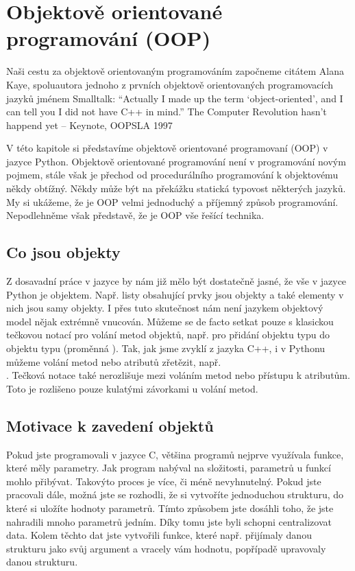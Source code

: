 \chapter{Objektově orientované programování (OOP)}

Naši cestu za objektově orientovaným programováním započneme citátem Alana Kaye, spoluautora jednoho
z prvních objektově orientovaných programovacích jazyků jménem Smalltalk:
\vskip0.5cm
\noindent
``Actually I made up the term `object-oriented', and I can tell
you I did not have C++ in mind.''
\vskip0.3cm
\noindent
The Computer Revolution hasn’t happend yet -- Keynote, OOPSLA 1997

\vskip0.5cm

V této kapitole si představíme objektově orientované programovaní (OOP) v jazyce Python.
Objektově orientované programování není v programování novým pojmem, stále však je přechod
od procedurálního programování k objektovému někdy obtížný. Někdy může být na překážku statická typovost
některých jazyků. My si ukážeme, že je OOP velmi jednoduchý a příjemný způsob programování. Nepodlehněme
však představě, že je OOP vše řešící technika.


\section{Co jsou objekty}

Z dosavadní práce v jazyce by nám již mělo být dostatečně jasné, že vše v jazyce Python je objektem.
Např. listy obsahující prvky jsou objekty a také elementy v nich jsou samy objekty. I přes tuto skutečnost
nám není jazykem objektový model nějak extrémně vnucován. Můžeme se de facto setkat pouze s klasickou
tečkovou notací pro volání metod objektů, např.  pro přidání objektu typu
 do objektu typu  (proměnná ). Tak, jak jsme zvyklí z jazyka C++, i v Pythonu
můžeme volání metod nebo atributů zřetězit, např. \\ . Tečková notace
také nerozlišuje mezi voláním metod nebo přístupu k atributům. Toto je rozlišeno pouze kulatými
závorkami u volání metod.


\section{Motivace k zavedení objektů}

Pokud jste programovali v jazyce C, většina programů nejprve využívala funkce, které měly parametry.
Jak program nabýval na složitosti, parametrů u funkcí mohlo přibývat. Takovýto proces je více, či méně
nevyhnutelný. Pokud jste pracovali dále, možná jste se rozhodli, že si vytvoříte jednoduchou strukturu,
do které si uložíte hodnoty parametrů. Tímto způsobem jste dosáhli toho, že jste nahradili mnoho parametrů
jedním. Díky tomu jste byli schopni centralizovat data. Kolem těchto dat jste vytvořili funkce, které
např. přijímaly danou strukturu jako svůj argument a vracely vám hodnotu, popřípadě upravovaly danou
strukturu.

